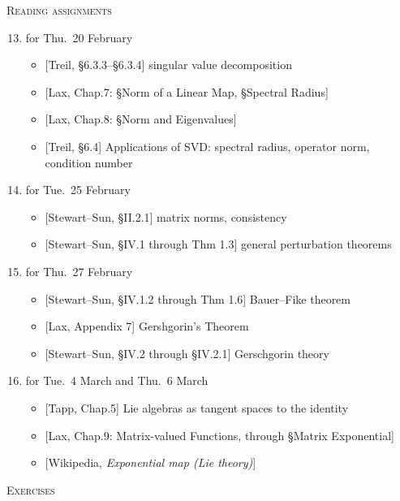\documentclass[11pt]{article}
\newcommand\total[2]{\marginpar{\colorbox{yellow}{\huge #1/#2}}}
\newcommand\0{\mathbf{0}}
\newcommand\<{\langle}
\renewcommand\>{\rangle}
\begin{document}
\noindent
\textsc{Reading assignments}\total{}{42}%
\begin{enumerate}[itemsep=-1ex]\setcounter{enumi}{12}
\item%
for Thu.~20 February
  \begin{itemize}
  \item{}%
  [Treil, \S 6.3.3--\S 6.3.4] singular value decomposition
  \item{}%
  [Lax, Chap.7: \S Norm of a Linear Map, \S Spectral Radius]
  \item{}%
  [Lax, Chap.8: \S Norm and Eigenvalues]
  \item{}%
  [Treil, \S 6.4] Applications of SVD: spectral radius, operator norm,
  condition number
  \end{itemize}

\item%
for Tue.~25 February
  \begin{itemize}
  \item{}%
  [Stewart--Sun, \S II.2.1] matrix norms, consistency
  \item{}%
  [Stewart--Sun, \S IV.1 through Thm 1.3] general perturbation theorems
  \end{itemize}

\item%
for Thu.~27 February
  \begin{itemize}
  \item{}%
  [Stewart--Sun, \S IV.1.2 through Thm 1.6] Bauer--Fike theorem
  \item{}%
  [Lax, Appendix 7] Gershgorin's Theorem
  \item{}%
  [Stewart--Sun, \S IV.2 through \S IV.2.1] Gerschgorin theory
  \end{itemize}

\item[16--17.]\addtocounter{enumi}{2}%
for Tue.~4 March and Thu.~6 March
  \begin{itemize}
  \item{}%
  [Tapp, Chap.5] Lie algebras as tangent spaces to the identity
  \item{}%
  [Lax, Chap.9: Matrix-valued Functions, through \S Matrix Exponential]
  \item{}%
  [Wikipedia, \emph{Exponential map (Lie theory)}]
  \end{itemize}
\end{enumerate}

\noindent
\textsc{Exercises}%
\end{document}

